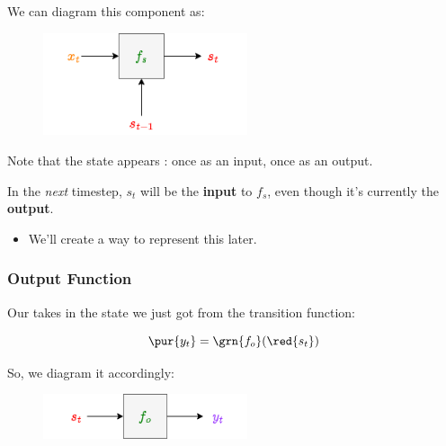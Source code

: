             We can diagram this component as:
            
            \begin{figure}[H]
                \centering
                \includegraphics[width=60mm,scale=0.4]{images/rnn_images/transition_diagram.png}
            \end{figure}
            
            Note that the state appears : once as an input, once as an output.
            
            In the \textit{next} timestep, $s_t$ will be the \textbf{input} to $f_s$, even though it's currently the \textbf{output}.

            \begin{itemize}
                \item We'll create a way to represent this later.
            \end{itemize}
            
        
        \subsecdiv
        
        \subsubsection{Output Function}
        
            Our  takes in the state we just got from the transition function:
            
            \begin{equation}
                \pur{y_t} = 
                \grn{f_o}(\red{s_t})
            \end{equation}
            
            So, we diagram it accordingly:
            
            \begin{figure}[H]
                \centering
                \includegraphics[width=60mm,scale=0.4]{images/rnn_images/output_diagram.png}
            \end{figure}
            
